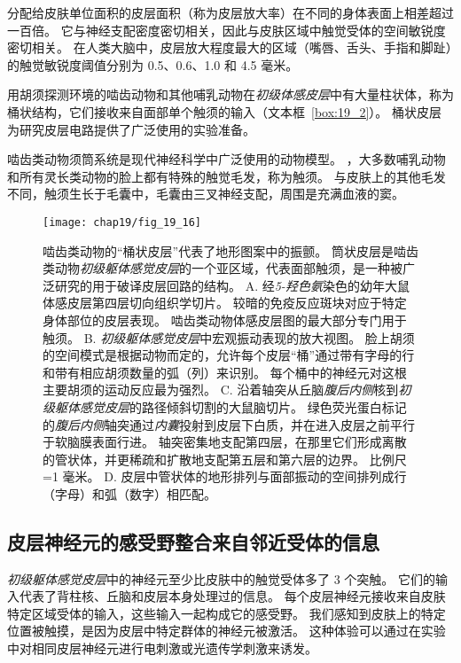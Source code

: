 分配给皮肤单位面积的皮层面积（称为皮层放大率）在不同的身体表面上相差超过一百倍。
它与神经支配密度密切相关，因此与皮肤区域中触觉受体的空间敏锐度密切相关。
在人类大脑中，皮层放大程度最大的区域（嘴唇、舌头、手指和脚趾）的触觉敏锐度阈值分别为 0.5、0.6、1.0 和 4.5 毫米。


用胡须探测环境的啮齿动物和其他哺乳动物在\textit{初级体感皮层}中有大量柱状体，称为桶状结构，它们接收来自面部单个触须的输入（文本框~\ref{box:19_2}）。
桶状皮层为研究皮层电路提供了广泛使用的实验准备。



\begin{proposition}[啮齿动物须桶系统] \label{box:19_2}
	
	\quad \quad 啮齿类动物须筒系统是现代神经科学中广泛使用的动物模型。
	，大多数哺乳动物和所有灵长类动物的脸上都有特殊的触觉毛发，称为触须。
	与皮肤上的其他毛发不同，触须生长于毛囊中，毛囊由三叉神经支配，周围是充满血液的窦。
	
\end{proposition}


\begin{figure}[htbp]
	\centering
	\texttt{[image: chap19/fig\_19\_16]}
	\caption{啮齿类动物的“桶状皮层”代表了地形图案中的振颤。
		筒状皮层是啮齿类动物\textit{初级躯体感觉皮层}的一个亚区域，代表面部触须，是一种被广泛研究的用于破译皮层回路的结构。
		A. 经\textit{5-羟色氨}染色的幼年大鼠体感皮层第四层切向组织学切片。
		较暗的免疫反应斑块对应于特定身体部位的皮层表现。
		啮齿类动物体感皮层图的最大部分专门用于触须。
		B. \textit{初级躯体感觉皮层}中宏观振动表现的放大视图。
		脸上胡须的空间模式是根据动物而定的，允许每个皮层“桶”通过带有字母的行和带有相应胡须数量的弧（列）来识别。
		每个桶中的神经元对这根主要胡须的运动反应最为强烈。
		C. 沿着轴突从丘脑\textit{腹后内侧}核到\textit{初级躯体感觉皮层}的路径倾斜切割的大鼠脑切片。
		绿色荧光蛋白标记的\textit{腹后内侧}轴突通过\textit{内囊}投射到皮层下白质，并在进入皮层之前平行于软脑膜表面行进。
		轴突密集地支配第四层，在那里它们形成离散的管状体，并更稀疏和扩散地支配第五层和第六层的边界。
		比例尺=1 毫米。
		D. 皮层中管状体的地形排列与面部振动的空间排列成行（字母）和弧（数字）相匹配。}
	\label{fig:19_16}
\end{figure}



\subsection{皮层神经元的感受野整合来自邻近受体的信息}


\textit{初级躯体感觉皮层}中的神经元至少比皮肤中的触觉受体多了 3 个突触。
它们的输入代表了背柱核、丘脑和皮层本身处理过的信息。 
每个皮层神经元接收来自皮肤特定区域受体的输入，这些输入一起构成它的感受野。
我们感知到皮肤上的特定位置被触摸，是因为皮层中特定群体的神经元被激活。
这种体验可以通过在实验中对相同皮层神经元进行电刺激或光遗传学刺激来诱发。


